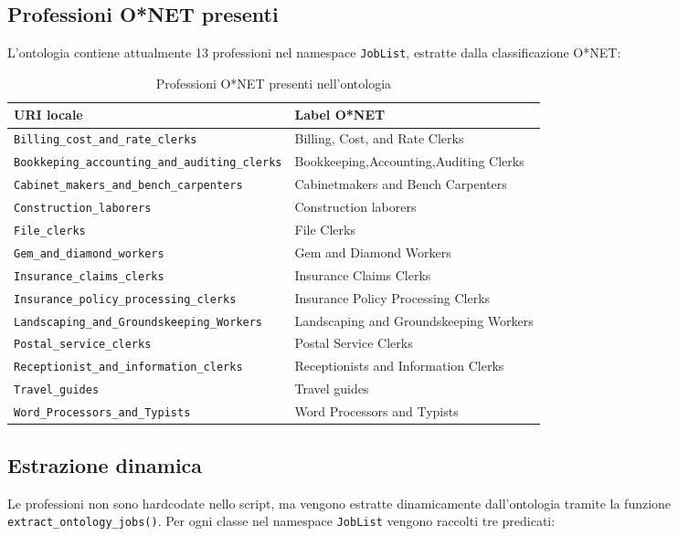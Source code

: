 \documentclass[12pt, a4paper]{report}
\begin{document}
\subsection{Professioni O*NET presenti}

L'ontologia contiene attualmente 13 professioni nel namespace
\texttt{JobList}, estratte dalla classificazione O*NET:

\begin{table}[H]
\centering
\begin{tabular}{ll}
\toprule
\textbf{URI locale} & \textbf{Label O*NET} \\
\midrule
\texttt{Billing\_cost\_and\_rate\_clerks} & Billing, Cost, and Rate Clerks \\
\texttt{Bookkeping\_accounting\_and\_auditing\_clerks} & Bookkeeping,Accounting,Auditing Clerks \\
\texttt{Cabinet\_makers\_and\_bench\_carpenters} & Cabinetmakers and Bench Carpenters \\
\texttt{Construction\_laborers} & Construction laborers \\
\texttt{File\_clerks} & File Clerks \\
\texttt{Gem\_and\_diamond\_workers} & Gem and Diamond Workers \\
\texttt{Insurance\_claims\_clerks} & Insurance Claims Clerks \\
\texttt{Insurance\_policy\_processing\_clerks} & Insurance Policy Processing Clerks \\
\texttt{Landscaping\_and\_Groundskeeping\_Workers} & Landscaping and Groundskeeping Workers \\
\texttt{Postal\_service\_clerks} & Postal Service Clerks \\
\texttt{Receptionist\_and\_information\_clerks} & Receptionists and Information Clerks \\
\texttt{Travel\_guides} & Travel guides \\
\texttt{Word\_Processors\_and\_Typists} & Word Processors and Typists \\
\bottomrule
\end{tabular}
\caption{Professioni O*NET presenti nell'ontologia}
\end{table}

\subsection{Estrazione dinamica}

Le professioni non sono hardcodate nello script, ma vengono estratte
dinamicamente dall'ontologia tramite la funzione
\texttt{extract\_ontology\_jobs()}. Per ogni classe nel namespace
\texttt{JobList} vengono raccolti tre predicati:
\end{document}
